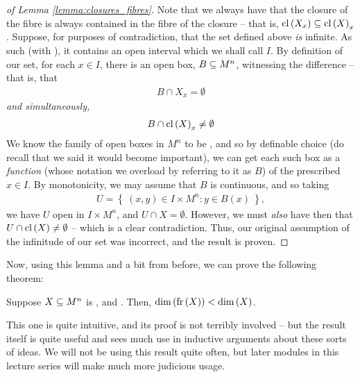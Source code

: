 \begin{proof}[of Lemma \ref{lemma:closures_fibres}]
  Note that we always have that the closure of the fibre is always contained in the fibre of the closure -- that is, $\cl{X_x} \subseteq \cl{X}_x$. Suppose, for purposes of contradiction, that the set defined above \emph{is} infinite. As such (with ), it contains an open interval which we shall call $I$. By definition of our set, for each $x \in I$, there is an open box, $\XMn[B]{n}$, witnessing the difference -- that is, that
    \begin{align*}
     B \cap X_x = \emptyset
    \end{align*}
  \emph{and simultaneously,}
    \begin{align*}
      B \cap \cl{X}_x \neq \emptyset
    \end{align*}
  We know the family of open boxes in $M^n$ to be , and so by definable choice (do recall that we said it would become important), we can get each such box as a \emph{ function} (whose notation we overload by referring to it as $B$) of the prescribed $x \in I$. By monotonicity, we may assume that $B$ is continuous, and so taking
    \begin{align*}
      U = \left\{ \ (x, y) \in I \times M^n \colon y \in B(x) \ \right\},
    \end{align*}
  we have $U$ open in $I \times M^n$, and $U \cap X = \emptyset$. However, we must \emph{also} have then that $U \cap \cl{X} \neq \emptyset$ -- which is a clear contradiction. Thus, our original assumption of the infinitude of our set was incorrect, and the result is proven.
\end{proof}

Now, using this lemma and a bit from before, we can prove the following theorem:

\begin{theorem}
  \label{thm:fr_dim}
  Suppose $\XMn{n}$ is \inhb, and . Then, $\dim{\fr{X}} < \dim{X}$.
\end{theorem}

This one is quite intuitive, and its proof is not terribly involved -- but the result itself is quite useful and sees much use in inductive arguments about these sorts of ideas. We will not be using this result quite often, but later modules in this lecture series will make much more judicious usage.


